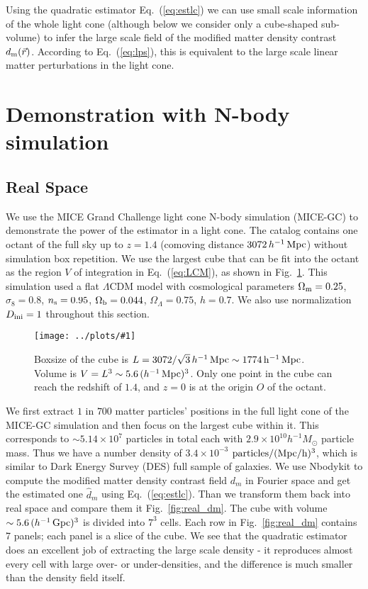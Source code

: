 \documentclass[prd,amsmath,amssymb,floatfix,superscriptaddress,nofootinbib,twocolumn]{revtex4-1}
\newcommand{\ini}{\rm ini}
\newcommand{\vrr}{\vec{r}}
\newcommand{\vk}{\vec{k}}
\newcommand{\ec}[1]{Eq.~(\ref{eq:#1})}
\newcommand{\rf}[1]{\ref{fig:#1}}
\newcommand{\sfig}[2]{
\texttt{[image: ../plots/\#1]}
        }
\newcommand{\Sfig}[2]{
   \begin{figure}[thbp]
   \begin{center}
    \sfig{../plots/#1.pdf}{\columnwidth}
    \caption{{\small #2}}
    \label{fig:#1}
     \end{center}
   \end{figure}
}
\begin{document}
Using the quadratic estimator \ec{estlc} we can use small scale information of the whole light cone (although below we consider only a cube-shaped sub-volume) to infer the large scale field of the modified matter density contrast $d_{\rm m}(\vrr)$. According to \ec{lps}, this is equivalent to the large scale linear matter perturbations in the light cone.

\section{Demonstration with N-body simulation} \label{sec6}
\subsection{Real Space}
\noindent We use the MICE Grand Challenge light cone N-body simulation (MICE-GC) to demonstrate the power of the estimator in a light cone. The catalog contains one octant of the full sky up to $z = 1.4$ (comoving distance $3072\, h^{-1}\, \rm Mpc$) without simulation box repetition. We use the largest cube that can be fit into the octant as the region $V$ of integration in \ec{LCM}, as shown in Fig.~\rf{Cube}. This simulation used a flat $\Lambda$CDM model with cosmological parameters $ \Omega_{\rm m}=0.25$, $\sigma_8 = 0.8$, $n_{\rm s}=0.95$, $\Omega_{\rm b}=0.044$, $\Omega_{\Lambda}=0.75$, $h=0.7$. We also use normalization $D_{\ini}=1$ throughout this section. 

\Sfig{Cube}{Boxsize of the cube is $L=3072/\sqrt{3}\, h^{-1}\, \rm Mpc\sim 1774\, h^{-1}\, \rm Mpc$. Volume is $V=L^3\sim 5.6\,(h^{-1}\,\rm Mpc)^3$. Only one point in the cube can reach the redshift of $1.4$, and $z=0$ is at the origin $O$ of the octant.}

We first extract $1$ in $700$  matter particles' positions in the full light cone of the MICE-GC simulation and then focus on the largest cube within it. This corresponds to $\sim 5.14\times 10^{7}$ particles in total each with $2.9\times 10^{10} h^{-1}M_{\odot}$ particle mass. Thus we have a number density of $3.4\times 10^{-3}$ $\rm particles/(Mpc/h)^3$, which is similar to Dark Energy Survey (DES) \cite{DES:2016DES} full sample of galaxies. We use Nbodykit \cite{Hand:2018nby} to compute the modified matter density contrast field $d_m$ in Fourier space and get the estimated one $\hat d_m$ using \ec{estlc}. Than we transform them back into real space and compare them it Fig.~\rf{real_dm}. The cube with volume $\sim5.6\,(h^{-1}\,\rm Gpc)^3$ is divided into $7^3$ cells. Each row in Fig.~\rf{real_dm} contains 7 panels; each panel is a slice of the cube. We see that the quadratic estimator does an excellent job of extracting the large scale density - it reproduces almost every cell with large over- or under-densities, and the difference is much smaller than the density field itself.
\end{document}
